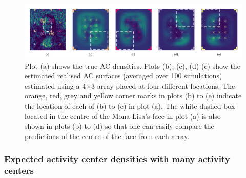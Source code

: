 \documentclass[10pt,a4paper]{article}
\begin{document}
\begin{figure}[htbp]
\centering
\includegraphics[width=1\textwidth]{mona_torch_higheffort.png}
\caption{Plot (a) shows the true AC densities. Plots (b), (c), (d) (e) show the estimated realised AC surfaces (averaged over 100 simulations) estimated using a 4$\times$3 array placed at four different locations. The orange, red, grey and yellow corner marks in plots (b) to (e) indicate the location of each of (b) to (e) in plot (a). The white dashed box located in the centre of the Mona Lisa's face in plot (a) is also shown in plots (b) to (d) so that one can easily compare the predictions of the centre of the face from each array.}
\label{mona_torch_higheffort}
\end{figure}



\subsubsection{Expected activity center densities with many activity centers}
\end{document}
